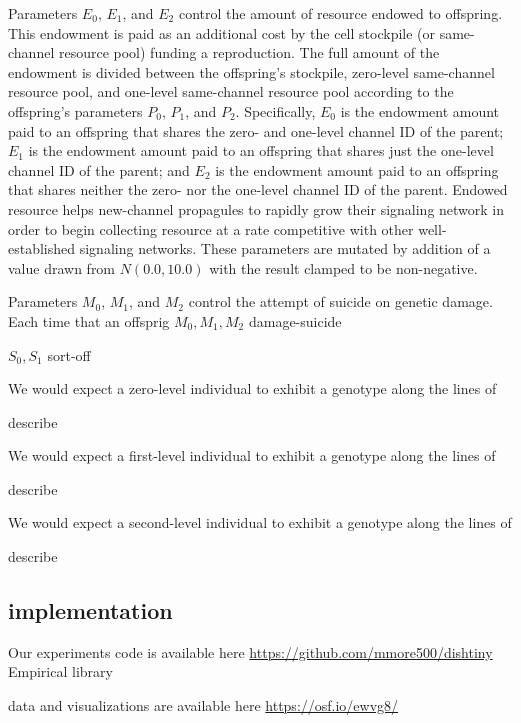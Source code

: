 Parameters $E_0$, $E_1$, and $E_2$ control the amount of resource endowed to offspring.
This endowment is paid as an additional cost by the cell stockpile (or same-channel resource pool) funding a reproduction.
The full amount of the endowment is divided between the offspring's stockpile, zero-level same-channel resource pool, and one-level same-channel resource pool according to the offspring's parameters $P_0$, $P_1$, and $P_2$.
Specifically, $E_0$ is the endowment amount paid to an offspring that shares the zero- and one-level channel ID of the parent;
$E_1$ is the endowment amount paid to an offspring that shares just the one-level channel ID of the parent;
and $E_2$ is the endowment amount paid to an offspring that shares neither the zero- nor the one-level channel ID of the parent.
Endowed resource helps new-channel propagules to rapidly grow their signaling network in order to begin collecting resource at a rate competitive with other well-established signaling networks.
These parameters are mutated by addition of a value drawn from $N(0.0,10.0)$ with the result clamped to be non-negative.

Parameters $M_0$, $M_1$, and $M_2$ control the attempt of suicide on genetic damage.
Each time that an offsprig
$M_0, M_1, M_2$
damage-suicide

$S_0, S_1$
sort-off


We would expect a zero-level individual to exhibit a genotype along the lines of

describe

We would expect a first-level individual to exhibit a genotype along the lines of

describe



We would expect a second-level individual to exhibit a genotype along the lines of

describe

\subsection{implementation}

Our experiments
code is available here \url{https://github.com/mmore500/dishtiny}
Empirical library

data and visualizations are available here \url{https://osf.io/ewvg8/}
